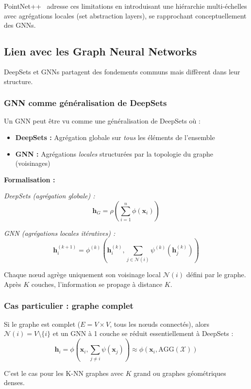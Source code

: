 PointNet++~\cite{Qi2017b} adresse ces limitations en introduisant une hiérarchie multi-échelles avec agrégations locales (set abstraction layers), se rapprochant conceptuellement des GNNs.

\subsection{Lien avec les Graph Neural Networks}

DeepSets et GNNs partagent des fondements communs mais diffèrent dans leur structure.

\subsubsection{GNN comme généralisation de DeepSets}

Un GNN peut être vu comme une généralisation de DeepSets où :
\begin{itemize}
    \item \textbf{DeepSets :} Agrégation globale sur \textit{tous} les éléments de l'ensemble
    \item \textbf{GNN :} Agrégations \textit{locales} structurées par la topologie du graphe (voisinages)
\end{itemize}

\textbf{Formalisation :}

\textit{DeepSets (agrégation globale) :}
\[
\mathbf{h}_G = \rho\left(\sum_{i=1}^n \phi(\mathbf{x}_i)\right)
\]

\textit{GNN (agrégations locales itératives) :}
\[
\mathbf{h}_i^{(k+1)} = \phi^{(k)}\left(\mathbf{h}_i^{(k)}, \sum_{j \in \mathcal{N}(i)} \psi^{(k)}(\mathbf{h}_j^{(k)})\right)
\]

Chaque nœud agrège uniquement son voisinage local $\mathcal{N}(i)$ défini par le graphe. Après $K$ couches, l'information se propage à distance $K$.

\subsubsection{Cas particulier : graphe complet}

Si le graphe est complet ($E = V \times V$, tous les nœuds connectés), alors $\mathcal{N}(i) = V \setminus \{i\}$ et un GNN à 1 couche se réduit essentiellement à DeepSets :
\[
\mathbf{h}_i = \phi\left(\mathbf{x}_i, \sum_{j \neq i} \psi(\mathbf{x}_j)\right) \approx \phi(\mathbf{x}_i, \text{AGG}(\mathcal{X}))
\]

C'est le cas pour les K-NN graphes avec $K$ grand ou graphes géométriques denses.


